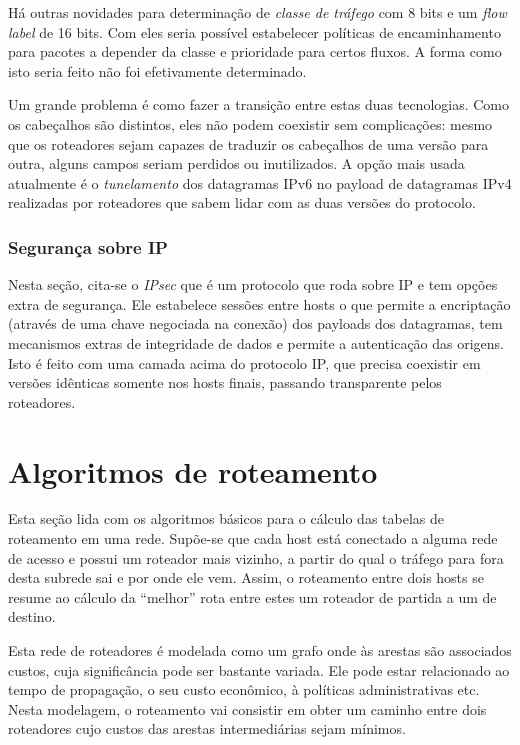 Há outras novidades para determinação de \emph{classe de tráfego} com 8 bits e um \emph{flow label} de 16 bits.
Com eles seria possível estabelecer políticas de encaminhamento para pacotes a depender da classe e prioridade para certos fluxos.
A forma como isto seria feito não foi efetivamente determinado.

Um grande problema é como fazer a transição entre estas duas tecnologias. 
Como os cabeçalhos são distintos, eles não podem coexistir sem complicações: mesmo que os roteadores sejam capazes de traduzir os cabeçalhos de uma versão para outra, alguns campos seriam perdidos ou inutilizados.
A opção mais usada atualmente é o \emph{tunelamento} dos datagramas IPv6 no payload de datagramas IPv4 realizadas por roteadores que sabem lidar com as duas versões do protocolo.

\subsubsection{Segurança sobre IP}

Nesta seção, cita-se o \emph{IPsec} que é um protocolo que roda sobre IP e tem opções extra de segurança.
Ele estabelece sessões entre hosts o que permite a encriptação (através de uma chave negociada na conexão) dos payloads dos datagramas,
tem mecanismos extras de integridade de dados e permite a autenticação das origens.
Isto é feito com uma camada acima do protocolo IP, que precisa coexistir em versões idênticas somente nos hosts finais, passando transparente pelos roteadores.


\section{Algoritmos de roteamento}

Esta seção lida com os algoritmos básicos para o cálculo das tabelas de roteamento em uma rede.
Supõe-se que cada host está conectado a alguma rede de acesso e possui um roteador mais vizinho, a partir do qual o tráfego para fora desta subrede sai e por onde ele vem.
Assim, o roteamento entre dois hosts se resume ao cálculo da ``melhor'' rota entre estes um roteador de partida a um de destino.

Esta rede de roteadores é modelada como um grafo onde às arestas são associados custos, cuja significância pode ser bastante variada.
Ele pode estar relacionado ao tempo de propagação, o seu custo econômico, à políticas administrativas etc.
Nesta modelagem, o roteamento vai consistir em obter um caminho entre dois roteadores cujo custos das arestas intermediárias sejam mínimos.

